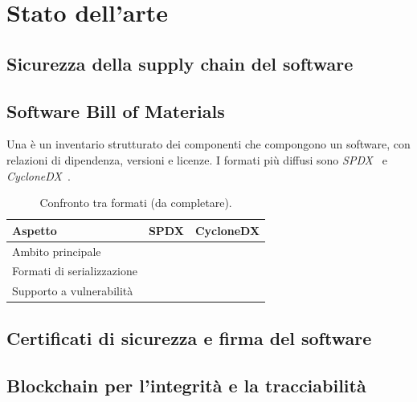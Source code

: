 \chapter{Stato dell'arte}
\label{cap:stato-arte}

\section{Sicurezza della supply chain del software}

\section{Software Bill of Materials}
Una \sbom{} è un inventario strutturato dei componenti che compongono un software, con relazioni di
dipendenza, versioni e licenze. I formati più diffusi sono \emph{SPDX}~\cite{spdx} e \emph{CycloneDX}~\cite{cyclonedx}.

\begin{table}[htbp]
  \centering
  \caption{Confronto tra formati \sbom{} (da completare).}
  \label{tab:formati-sbom}
  \begin{tabularx}{\linewidth}{@{}lXX@{}}
    \toprule
    \textbf{Aspetto} & \textbf{SPDX} & \textbf{CycloneDX}\\
    \midrule
    Ambito principale & \todo{} & \todo{}\\
    Formati di serializzazione & \todo{} & \todo{}\\
    Supporto a vulnerabilità & \todo{} & \todo{}\\
    \bottomrule
  \end{tabularx}
\end{table}

\section{Certificati di sicurezza e firma del software}

\section{Blockchain per l'integrità e la tracciabilità}
